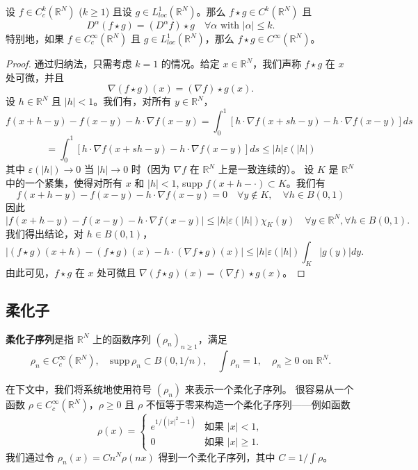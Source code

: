 \begin{proposition}\label{proposition4.20}
设 $f \in C_c^k(\mathbb{R}^N)$ ($k \ge 1$) 且设 $g \in L^1_{loc}(\mathbb{R}^N)$。那么 $f \star g \in C^k(\mathbb{R}^N)$ 且
\[ D^\alpha(f \star g) = (D^\alpha f) \star g \quad \forall \alpha \text{ with } |\alpha| \le k. \]
特别地，如果 $f \in C_c^\infty(\mathbb{R}^N)$ 且 $g \in L^1_{loc}(\mathbb{R}^N)$，那么 $f \star g \in C^\infty(\mathbb{R}^N)$。
\end{proposition}

\begin{proof}
通过归纳法，只需考虑 $k=1$ 的情况。给定 $x \in \mathbb{R}^N$，我们声称 $f \star g$ 在 $x$ 处可微，并且
\[ \nabla(f \star g)(x) = (\nabla f) \star g(x). \]
设 $h \in \mathbb{R}^N$ 且 $|h| < 1$。我们有，对所有 $y \in \mathbb{R}^N$，
\[ f(x+h-y) - f(x-y) - h \cdot \nabla f(x-y) = \int_0^1 [h \cdot \nabla f(x+sh-y) - h \cdot \nabla f(x-y)] ds \]
\[ = \int_0^1 [h \cdot \nabla f(x+sh-y) - h \cdot \nabla f(x-y)] ds \le |h| \varepsilon(|h|) \]
其中 $\varepsilon(|h|) \to 0$ 当 $|h| \to 0$ 时（因为 $\nabla f$ 在 $\mathbb{R}^N$ 上是一致连续的）。
设 $K$ 是 $\mathbb{R}^N$ 中的一个紧集，使得对所有 $x$ 和 $|h|<1$, supp $f(x+h-\cdot) \subset K$。我们有
\[ f(x+h-y) - f(x-y) - h \cdot \nabla f(x-y) = 0 \quad \forall y \notin K, \quad \forall h \in B(0,1) \]
因此
\[ |f(x+h-y) - f(x-y) - h \cdot \nabla f(x-y)| \le |h|\varepsilon(|h|)\chi_K(y) \quad \forall y \in \mathbb{R}^N, \forall h \in B(0,1). \]
我们得出结论，对 $h \in B(0,1)$，
\[ |(f \star g)(x+h) - (f \star g)(x) - h \cdot (\nabla f \star g)(x)| \le |h|\varepsilon(|h|) \int_K |g(y)| dy. \]
由此可见，$f \star g$ 在 $x$ 处可微且 $\nabla(f \star g)(x) = (\nabla f) \star g(x)$。
\end{proof}

\subsection*{柔化子}

\begin{definition}
\textbf{柔化子序列}是指 $\mathbb{R}^N$ 上的函数序列 $(\rho_n)_{n \ge 1}$，满足
\[ \rho_n \in C_c^\infty(\mathbb{R}^N), \quad \mathrm{supp}\,\rho_n \subset B(0, 1/n), \quad \int \rho_n = 1, \quad \rho_n \ge 0 \text{ on } \mathbb{R}^N. \]
\end{definition}

在下文中，我们将系统地使用符号 $(\rho_n)$ 来表示一个柔化子序列。
很容易从一个函数 $\rho \in C_c^\infty(\mathbb{R}^N)$，$\rho \ge 0$ 且 $\rho$ 不恒等于零来构造一个柔化子序列——例如函数
\[ \rho(x) = \begin{cases} e^{1/(|x|^2-1)} & \text{如果 } |x| < 1, \\ 0 & \text{如果 } |x| \ge 1. \end{cases} \]
我们通过令 $\rho_n(x) = C n^N \rho(nx)$ 得到一个柔化子序列，其中 $C=1/\int \rho$。

